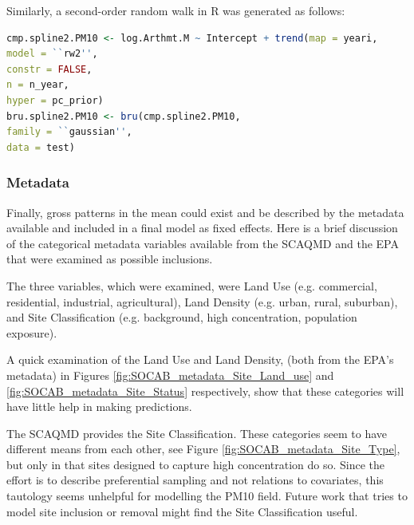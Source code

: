 Similarly, a second-order random walk in R was generated as follows:
\begin{lstlisting}[language = R]
cmp.spline2.PM10 <- log.Arthmt.M ~ Intercept + trend(map = yeari,
model = ``rw2'',
constr = FALSE,
n = n_year,
hyper = pc_prior)
bru.spline2.PM10 <- bru(cmp.spline2.PM10,
family = ``gaussian'',
data = test)

\end{lstlisting}

\subsubsection{Metadata}
\label{subsubsec:metadata}
Finally, gross patterns in the mean could exist and be described by the metadata available and included in a final model as fixed effects.  Here is a brief discussion of the categorical metadata variables available from the \ac{SCAQMD} and the \ac{EPA} that were examined as possible inclusions.

The three variables, which were examined,  were Land Use (e.g. commercial, residential, industrial, agricultural), Land Density (e.g. urban, rural, suburban), and Site Classification (e.g. background, high concentration, population exposure).

A quick examination of the Land Use and Land Density, (both from the \ac{EPA}'s metadata) in Figures \ref{fig:SOCAB_metadata_Site_Land_use} and \ref{fig:SOCAB_metadata_Site_Status} respectively, show that these categories will have little help in making predictions.

The \ac{SCAQMD} provides the Site Classification.  These categories seem to have different means from each other, see Figure \ref{fig:SOCAB_metadata_Site_Type}, but only in that sites designed to capture high concentration do so.  Since the effort is to describe preferential sampling and not relations to covariates, this tautology seems unhelpful for modelling the \ac{PM10} field.  Future work that tries to model site inclusion or removal might find the Site Classification useful.  

